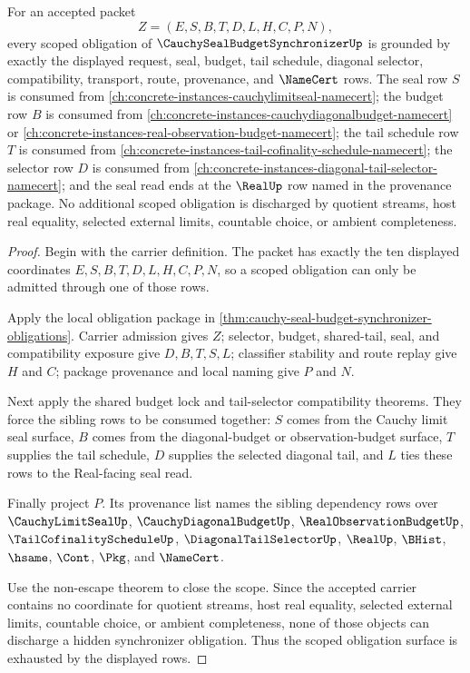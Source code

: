 \begin{theorem}
\label{thm:cauchy-seal-budget-synchronizer-scoped-row-grounding}
For an accepted packet
$$
Z=(E,S,B,T,D,L,H,C,P,N),
$$
every scoped obligation of $\CauchySealBudgetSynchronizerUp$ is grounded by exactly the displayed request, seal, budget, tail schedule, diagonal selector, compatibility, transport, route, provenance, and $\NameCert$ rows. The seal row $S$ is consumed from \autoref{ch:concrete-instances-cauchylimitseal-namecert}; the budget row $B$ is consumed from \autoref{ch:concrete-instances-cauchydiagonalbudget-namecert} or \autoref{ch:concrete-instances-real-observation-budget-namecert}; the tail schedule row $T$ is consumed from \autoref{ch:concrete-instances-tail-cofinality-schedule-namecert}; the selector row $D$ is consumed from \autoref{ch:concrete-instances-diagonal-tail-selector-namecert}; and the seal read ends at the $\RealUp$ row named in the provenance package. No additional scoped obligation is discharged by quotient streams, host real equality, selected external limits, countable choice, or ambient completeness.
\end{theorem}
\begin{proof}
Begin with the carrier definition. The packet has exactly the ten displayed coordinates $E,S,B,T,D,L,H,C,P,N$, so a scoped obligation can only be admitted through one of those rows.

Apply the local obligation package in \autoref{thm:cauchy-seal-budget-synchronizer-obligations}. Carrier admission gives $Z$; selector, budget, shared-tail, seal, and compatibility exposure give $D,B,T,S,L$; classifier stability and route replay give $H$ and $C$; package provenance and local naming give $P$ and $N$.

Next apply the shared budget lock and tail-selector compatibility theorems. They force the sibling rows to be consumed together: $S$ comes from the Cauchy limit seal surface, $B$ comes from the diagonal-budget or observation-budget surface, $T$ supplies the tail schedule, $D$ supplies the selected diagonal tail, and $L$ ties these rows to the Real-facing seal read.

Finally project $P$. Its provenance list names the sibling dependency rows over $\CauchyLimitSealUp$, $\CauchyDiagonalBudgetUp$, $\RealObservationBudgetUp$, $\TailCofinalityScheduleUp$, $\DiagonalTailSelectorUp$, $\RealUp$, $\BHist$, $\hsame$, $\Cont$, $\Pkg$, and $\NameCert$.

Use the non-escape theorem to close the scope. Since the accepted carrier contains no coordinate for quotient streams, host real equality, selected external limits, countable choice, or ambient completeness, none of those objects can discharge a hidden synchronizer obligation. Thus the scoped obligation surface is exhausted by the displayed rows.
\end{proof}

